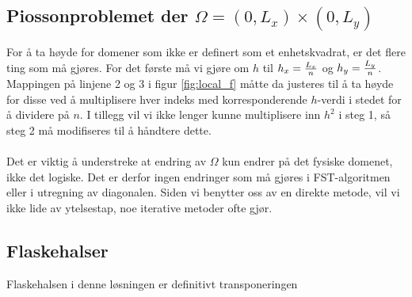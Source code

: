 \documentclass{article}
\begin{document}
\subsection{Piossonproblemet der $\Omega = (0, L_x) \times (0, L_y)$}
For å ta høyde for domener som ikke er definert som et enhetskvadrat, er det flere ting som må gjøres. For det første må vi gjøre om $h$ til $h_x = {L_x \over n}$ og $h_y = {L_y \over n}$. Mappingen på linjene 2 og 3 i figur \ref{fig:local_f} måtte da justeres til å ta høyde for disse ved å multiplisere hver indeks med korresponderende $h$-verdi i stedet for å dividere på $n$. I tillegg vil vi ikke lenger kunne multiplisere inn $h^2$ i steg 1, så steg 2 må modifiseres til å håndtere dette.\\
\\
Det er viktig å understreke at endring av $\Omega$ kun endrer på det fysiske domenet, ikke det logiske. Det er derfor ingen endringer som må gjøres i FST-algoritmen eller i utregning av diagonalen. Siden vi benytter oss av en direkte metode, vil vi ikke lide av ytelsestap, noe iterative metoder ofte gjør.

\subsection{Flaskehalser}
Flaskehalsen i denne løsningen er definitivt transponeringen


\end{document}
